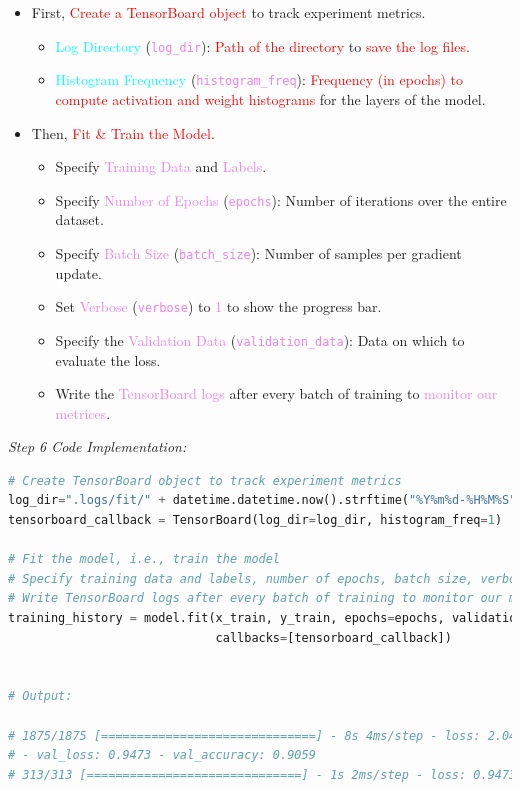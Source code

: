 \documentclass{book}
\begin{document}
\begin{itemize}
    \item First, \textcolor{red}{Create a TensorBoard object} to track experiment metrics.
    \begin{itemize}
        \item \textcolor{cyan}{Log Directory} (\textcolor{violet}{\texttt{log\_dir}}): \textcolor{red}{Path of the directory} to \textcolor{red}{save the log files}. 
        \item \textcolor{cyan}{Histogram Frequency} (\textcolor{violet}{\texttt{histogram\_freq}}): \textcolor{red}{Frequency (in epochs) to compute activation and weight histograms} for the layers of the model.
    \end{itemize}
    \item Then, \textcolor{red}{Fit \& Train the Model}.
    \begin{itemize}
        \item Specify \textcolor{violet}{Training Data} and \textcolor{violet}{Labels}.
        \item Specify \textcolor{violet}{Number of Epochs} (\textcolor{violet}{\texttt{epochs}}): Number of iterations over the entire dataset.
        \item Specify \textcolor{violet}{Batch Size} (\textcolor{violet}{\texttt{batch\_size}}): Number of samples per gradient update.
        \item Set \textcolor{violet}{Verbose} (\textcolor{violet}{\texttt{verbose}}) to \textcolor{violet}{1} to show the progress bar.
        \item Specify the \textcolor{violet}{Validation Data} (\textcolor{violet}{\texttt{validation\_data}}): Data on which to evaluate the loss.
        \item Write the \textcolor{violet}{TensorBoard logs} after every batch of training to \textcolor{violet}{monitor our metrices}.
    \end{itemize}
\end{itemize}
\newpage
\textit{\large{Step 6 Code Implementation:}}
\begin{lstlisting}[language=Python, basicstyle=\ttfamily\small, keywordstyle=\color{blue}, commentstyle=\color{forestgreen}, stringstyle=\color{red}, showstringspaces=false]
# Create TensorBoard object to track experiment metrics
log_dir=".logs/fit/" + datetime.datetime.now().strftime("%Y%m%d-%H%M%S")
tensorboard_callback = TensorBoard(log_dir=log_dir, histogram_freq=1)

# Fit the model, i.e., train the model
# Specify training data and labels, number of epochs, batch size, verbose, validation data
# Write TensorBoard logs after every batch of training to monitor our metrices
training_history = model.fit(x_train, y_train, epochs=epochs, validation_data=(x_test, y_test),
                             callbacks=[tensorboard_callback])   


# Output:

# 1875/1875 [==============================] - 8s 4ms/step - loss: 2.0401 - accuracy: 0.8783 
# - val_loss: 0.9473 - val_accuracy: 0.9059
# 313/313 [==============================] - 1s 2ms/step - loss: 0.9473 - accuracy: 0.9059
\end{lstlisting}
\end{document}

